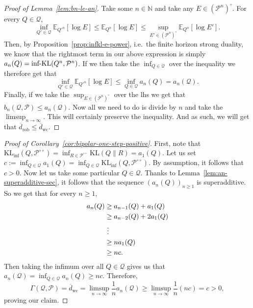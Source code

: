 \documentclass[11pt]{article}
\newcommand{\KL}{\mathrm{KL}}
\newcommand{\KLinf}{\mathrm{KL}_{\mathrm{inf}}}
\newcommand{\infKL}{\textnormal{inf-KL}}
\newcommand{\E}{\mathbb{E}}
\newcommand{\Pcal}{\mathcal{P}}
\newcommand{\Qcal}{\mathcal{Q}}
\theoremstyle{definition}
\theoremstyle{definition}
\begin{document}
\begin{proof}[Proof of Lemma~\ref{lem:bn-le-an}]
Take some $n\in\mathbb N$ and take any $E\in(\Pcal^n)^\circ$. For every $Q\in\Qcal$,
\[
\inf_{Q'\in\Qcal}\E_{Q'^n}[\log E]\le \E_{Q^n}[\log E] \le \sup_{E'\in(\Pcal^n)^\circ}\E_{Q^n}[\log E'].
\]
Then, by Proposition~\ref{prop:infkl-e-power}, i.e.\ the finite horizon strong duality, we know that the rightmost term in our above expression is simply $a_n(Q)=\infKL(Q^n,\Pcal^n)$. If we then take the $\inf_{Q\in\Qcal}$ over the inequality we therefore get that
\[
\inf_{Q'\in\Qcal}\E_{Q'^n}[\log E]\le \inf_{Q\in\Qcal} a_n(Q) = a_n(\Qcal).
\]
Finally, if we take the $\sup_{E\in(\Pcal^n)^\circ}$ over the lhs we get that $b_n(\Qcal,\Pcal)\le a_n(\Qcal)$. Now all we need to do is divide by $n$ and take the $\limsup_{n\to\infty}$. This will certainly preserve the inequality. And as such, we will get that $\overline d_{\mathrm{rob}}\le \overline d_{\mathrm{wc}}$. 
\end{proof}


\begin{proof}[Proof of Corollary~\ref{cor:bipolar-one-step-positive}]
First, note that $\KLinf(Q,\Pcal^{\circ\circ})=\inf_{R\in\Pcal^{\circ\circ}}\KL(Q\|R)=a_1(Q)$. Let us set $c:=\inf_{Q\in\Qcal} a_1(Q)=\inf_{Q\in\Qcal}\KLinf(Q,\Pcal^{\circ\circ})$. By assumption, it follows that $c>0$. Now let us take some particular $Q\in\Qcal$. Thanks to Lemma~\ref{lem:an-superadditive-sec}, it follows that the sequence $(a_n(Q))_{n\ge 1}$ is superadditive. So we get that for every $n\ge 1$,
\begin{align}
a_n(Q)&\ge a_{n-1}(Q)+a_1(Q)\notag\\
&\ge a_{n-2}(Q)+2a_1(Q)\notag\\
&\,\,\vdots\notag\\
&\ge na_1(Q)\notag\\
&\ge nc.
\label{eq:an-lower-by-al}
\end{align}
Then taking the infimum over all $Q\in\Qcal$ gives us that $a_n(\Qcal)=\inf_{Q\in\Qcal}a_n(Q)\ge nc$. Therefore,
\[
\Gamma(\Qcal,\Pcal)=\overline d_{\mathrm{wc}}=\limsup_{n\to\infty}\frac1n a_n(\Qcal)\ge \limsup_{n\to\infty}\frac1n (nc)=c>0,
\]
proving our claim.
\end{proof}
\end{document}
